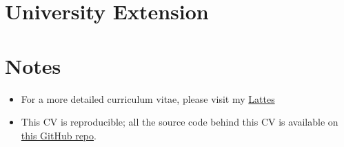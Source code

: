 \documentclass[11pt,a4paper,]{awesome-cv}
\providecommand{\tightlist}{%
	\setlength{\itemsep}{0pt}\setlength{\parskip}{0pt}}
\begin{document}
\hypertarget{university-extension}{%
\section{\texorpdfstring{ University
Extension}{ University Extension}}\label{university-extension}}

\begin{cventries}
\end{cventries}

\hypertarget{notes}{%
\section{Notes}\label{notes}}

\begin{itemize}
\tightlist
\item
  For a more detailed curriculum vitae, please visit my
  \href{http://lattes.cnpq.br/8074214277248039}{Lattes}
\item
  This CV is reproducible; all the source code behind this CV is
  available on \href{https://github.com/csthiago/cv}{this GitHub repo}.
\end{itemize}
\end{document}
